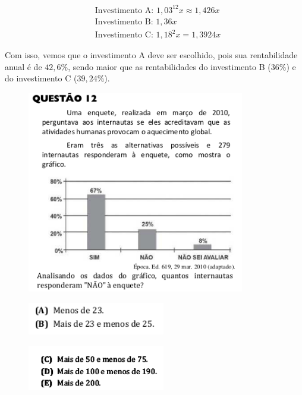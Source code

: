 \documentclass[a4paper]{article}
\begin{document}
\begin{align*}
&\text{Investimento A: }1,03^{12}x \approx 1,426x \\
&\text{Investimento B: }1,36x \\
&\text{Investimento C: }1,18^2x = 1,3924x
\end{align*}
\par\vspace{0.3cm} Com isso, vemos que o investimento A deve ser escolhido, pois sua rentabilidade anual é de $42,6\%$, sendo maior que as rentabilidades do investimento B ($36\%$) e do investimento C ($39,24\%$).
\begin{figure}[H]
	\begin{center}
		\includegraphics[width=9.5cm]{L3Q12_1.png}
	\end{center}
\end{figure}
\begin{figure}[H]
	\begin{center}
		\includegraphics[width=6cm]{L3Q12_3.png}
	\end{center}
\end{figure}
\begin{figure}[H]
	\begin{center}
		\includegraphics[width=6cm]{L3Q12_2.png}
	\end{center}
\end{figure}
\end{document}
